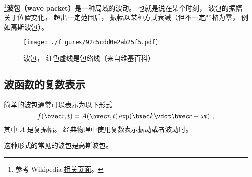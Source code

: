 

\footnote{参考 Wikipedia \href{https://en.wikipedia.org/wiki/Wave_packet}{相关页面}。}\textbf{波包（wave packet）}是一种局域的波动。 也就是说在某个时刻， 波包的振幅关于位置变化， 超出一定范围后， 振幅以某种方式衰减（但不一定严格为零， 例如高斯波包）。

\begin{figure}[ht]
\centering
\texttt{[image: ./figures/92c5cdd0e2ab25f5.pdf]}
\caption{波包， 红色虚线是包络线（来自维基百科）} \label{fig_WvPck_1}
\end{figure}

\subsection{波函数的复数表示}
简单的波包通常可以表示为以下形式
\begin{equation}
f(\bvec r, t) = A(\bvec r, t) \exp(\bvec k \vdot \bvec r - \omega t)~,
\end{equation}
其中 $A$ 是复振幅。 经典物理中使用复数表示振动或者波动时。

这种形式的常见的波包是高斯波包。

